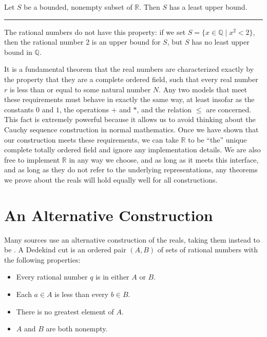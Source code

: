 \documentclass[letterpaper,10pt,english]{sphinxmanual}
\begin{document}
\sphinxAtStartPar
{} Let \(S\) be a bounded, nonempty subset of \(\mathbb{R}\). Then \(S\) has a least upper bound.


\bigskip\hrule\bigskip


\sphinxAtStartPar
The rational numbers do not have this property: if we set \(S = \{x \in \mathbb{Q} \mid x^2 < 2\}\), then the rational number 2 is an upper bound for \(S\), but \(S\) has no least upper bound in \(\mathbb{Q}\).

\sphinxAtStartPar
It is a fundamental theorem that the real numbers are characterized exactly by the property that they are a complete ordered field, such that every real number \(r\) is less than or equal to some natural number \(N\). Any two models that meet these requirements must behave in exactly the same way, at least insofar as the constants \(0\) and \(1\), the operations \(+\) and \(*\), and the relation \(\leq\) are concerned. This fact is extremely powerful because it allows us to avoid thinking about the Cauchy sequence construction in normal mathematics. Once we have shown that our construction meets these requirements, we can take \(\mathbb{R}\) to be “the” unique complete totally ordered field and ignore any implementation details. We are also free to implement \(\mathbb{R}\) in any way we choose, and as long as it meets this interface, and as long as they do not refer to the underlying representations, any theorems we prove about the reals will hold equally well for all constructions.


\section{An Alternative Construction}
\label{\detokenize{the_real_numbers:an-alternative-construction}}
\sphinxAtStartPar
Many sources use an alternative construction of the reals, taking them instead to be . A Dedekind cut is an ordered pair \((A, B)\) of sets of rational numbers with the following properties:
\begin{itemize}
\item {} 
\sphinxAtStartPar
Every rational number \(q\) is in either \(A\) or \(B\).

\item {} 
\sphinxAtStartPar
Each \(a \in A\) is less than every \(b \in B\).

\item {} 
\sphinxAtStartPar
There is no greatest element of \(A\).

\item {} 
\sphinxAtStartPar
\(A\) and \(B\) are both nonempty.

\end{itemize}
\end{document}
